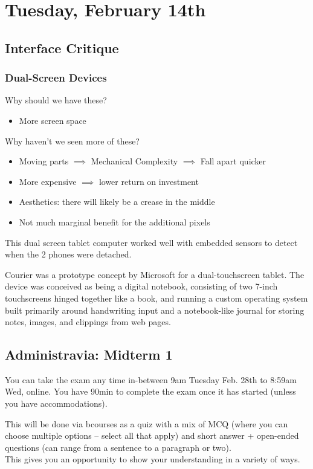 \section{Tuesday, February 14th}
\subsection{Interface Critique}
\subsubsection{Dual-Screen Devices}
Why should we have these?
\begin{itemize}
    \item More screen space
\end{itemize}

Why haven't we seen more of these?
\begin{itemize}
    \item Moving parts $\implies$ Mechanical Complexity $\implies$ Fall apart quicker
    \item More expensive $\implies$ lower return on investment
    \item Aesthetics: there will likely be a crease in the middle
    \item Not much marginal benefit for the additional pixels
\end{itemize}

This dual screen tablet computer worked well with embedded sensors to detect when the 2 phones were detached.

Courier was a prototype concept by Microsoft for a dual-touchscreen tablet. The device was conceived as being a digital notebook, consisting of two 7-inch touchscreens hinged together like a book, and running a custom operating system built primarily around handwriting input and a notebook-like journal for storing notes, images, and clippings from web pages.

\subsection{Administravia: Midterm 1}
You can take the exam any time in-between 9am Tuesday Feb. 28th to 8:59am Wed, online. You have 90min to complete the exam once it has started (unless you have accommodations).

This will be done via bcourses as a quiz with a mix of MCQ (where you can choose multiple options -- select all that apply) and short answer + open-ended questions (can range from a sentence to a paragraph or two). \\
This gives you an opportunity to show your understanding in a variety of ways.

